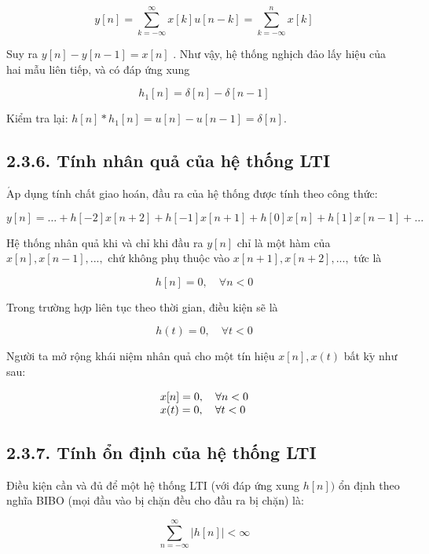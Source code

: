 \documentclass[
  10
]{article}
\begin{document}
\[
y [ n ] = \sum_ {k = - \infty} ^ {\infty} x [ k ] u [ n - k ] = \sum_ {k = - \infty} ^ {n} x [ k ]
\]

Suy ra \(y [ n ] - y [ n - 1 ] = x [ n ]\) . Như vậy, hệ thống nghịch
đảo lấy hiệu của hai mẫu liên tiếp, và có đáp ứng xung

\[
h _ {1} [ n ] = \delta [ n ] - \delta [ n - 1 ]
\]

Kiểm tra lại:
\(h [ n ] * h _ { 1 } [ n ] = u [ n ] - u [ n - 1 ] = \delta [ n ] .\)

\subsection{2.3.6. Tính nhân quả của hệ thống
LTI}\label{tuxednh-nhuxe2n-quux1ea3-cux1ee7a-hux1ec7-thux1ed1ng-lti}

\(\mathrm { { \acute { A } p } }\) dụng tính chất giao hoán, đầu ra của
hệ thống được tính theo công thức:

\[
y [ n ] = \dots + h [ - 2 ] x [ n + 2 ] + h [ - 1 ] x [ n + 1 ] + h [ 0 ] x [ n ] + h [ 1 ] x [ n - 1 ] + \dots
\]

Hệ thống nhân quả khi và chỉ khi đầu ra \(y [ n ]\) chỉ là một hàm của
\(x [ n ] , x [ n - 1 ] , . . . ,\) chứ không phụ thuộc vào
\(x [ n + 1 ] , x [ n + 2 ] , . . . ,\) tức là

\[
h [ n ] = 0, \quad \forall n <   0
\]

Trong trường hợp liên tục theo thời gian, điều kiện sẽ là

\[
h (t) = 0, \quad \forall t <   0
\]

Người ta mở rộng khái niệm nhân quả cho một tín hiệu
\(x [ n ] , x ( t )\) bất \(\mathrm { k } \mathrm { \tilde { y } }\) như
sau:

\[
\begin{array}{l l} {x [ n ] = 0, \quad \forall n <   0} \\ {x (t) = 0, \quad \forall t <   0} \end{array}
\]

\subsection{2.3.7. Tính ổn định của hệ thống
LTI}\label{tuxednh-ux1ed5n-ux111ux1ecbnh-cux1ee7a-hux1ec7-thux1ed1ng-lti}

Điều kiện cần và đủ để một hệ thống LTI (với đáp ứng xung \(h [ n ] )\)
ổn định theo nghĩa BIBO (mọi đầu vào bị chặn đều cho đầu ra bị chặn) là:

\[
\sum_ {n = - \infty} ^ {\infty} | h [ n ] | <   \infty\tag{2.6}
\]
\end{document}
